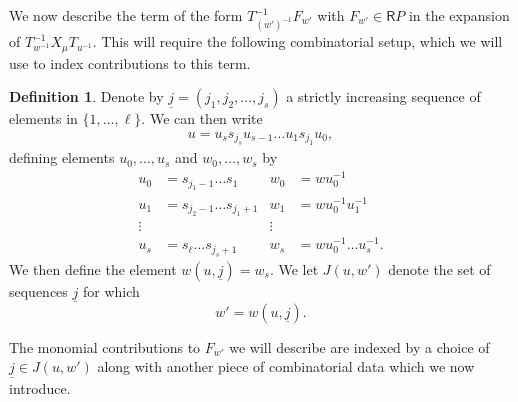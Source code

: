 \documentclass{amsart}
\newcommand{\Ring}{\mathsf{R}}
\theoremstyle{definition}
\newtheorem{defi}[Thm]{Definition}
\numberwithin{equation}{section}
\begin{document}
We now describe the term of the form $T_{(w')^{-1}}^{-1}F_{w'}$ with $F_{w'}\in \Ring P$ in the expansion of $T_{w^{-1}}^{-1} X_\mu T_{u^{-1}}$. This will require the following combinatorial setup, which we will use to index contributions to this term.

\begin{defi}
    Denote by $\underline{j} = (j_1, j_2, \dots, j_s)$ a strictly increasing sequence of elements in $\{1, \dots, \ell\}$. We can then write
    \begin{align}
        u = u_ss_{j_s}u_{s-1} \dots u_1s_{j_1}u_0,
    \end{align}
    defining elements $u_0, \dots, u_s$ and $w_0, \dots, w_s$ by
    \begin{align*}
        u_0 & = s_{j_1 - 1} \dots s_1 & w_0 & = wu_0^{-1}\\
        u_1 & = s_{j_2 - 1} \dots s_{j_1 + 1} & w_1 & = wu_0^{-1}u_1^{-1}\\[-1ex]
        \vdots & & \vdots & \\
        u_{s} & = s_\ell \dots s_{j_s + 1} & w_s & = wu_0^{-1} \dots u_s^{-1}.
    \end{align*}
    We then define the element $w(u, \underline{j}) = w_s$. We let $J(u, w')$ denote the set of sequences $\underline{j}$ for which \begin{equation}\label{eq:Weyl_element_decomposition}
w'=w(u, \underline{j}).
\end{equation}
\end{defi}

The monomial contributions to $F_{w'}$ we will describe are indexed by a choice of $\underline{j} \in J(u, w')$ along with another piece of combinatorial data which we now introduce.
\end{document}
